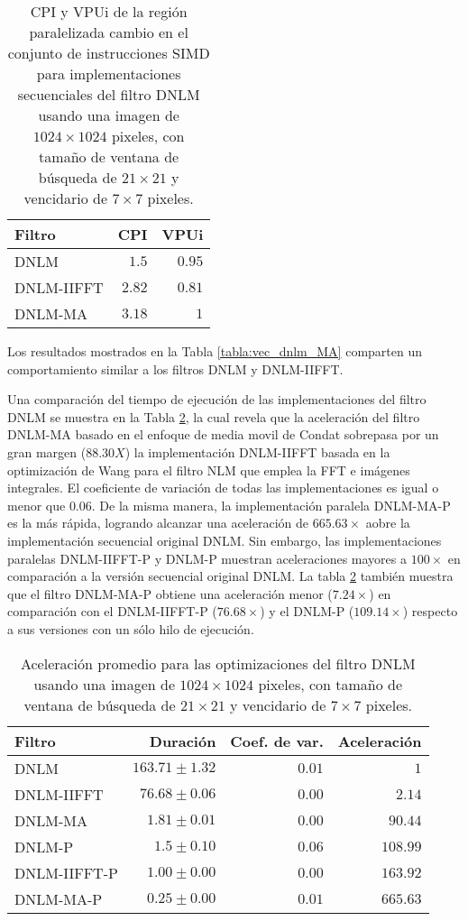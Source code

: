 \begin{table}
\protect\caption[Métricas CPI y VPUi de los filtros con 1 hilo]{CPI y VPUi de  la región paralelizada cambio en el conjunto de instrucciones SIMD para implementaciones secuenciales del filtro DNLM usando una imagen de  $1024 \times 1024$ pixeles, con tama\~no de ventana de búsqueda de $21 \times 21$ y vencidario de $7 \times 7$ pixeles. \label{tabla:vpui}}
\centering
\begin{tabular}{lrr}
Filtro  & CPI & VPUi \tabularnewline
\hline
DNLM & $1.5$ & $0.95$\tabularnewline
DNLM-IIFFT &$2.82$ & $0.81$  \tabularnewline
DNLM-MA &$3.18$&  $1$  \tabularnewline
\end{tabular}
\end{table}

Los resultados mostrados en la Tabla \ref{tabla:vec_dnlm_MA} comparten un comportamiento similar a los filtros DNLM y DNLM-IIFFT. 



Una comparación del tiempo de ejecución de las implementaciones del filtro DNLM se muestra en la Tabla \ref{tabla:speedup}, la cual revela que la aceleración del filtro DNLM-MA basado en el enfoque de media movil de Condat \cite{Condat2010} sobrepasa por un gran margen ($88.30X$) la implementación DNLM-IIFFT \cite{CalderonRamirez2017} basada en la optimización de Wang para el filtro NLM \cite{wang2006fast} que emplea la FFT e imágenes integrales. El coeficiente de variación de todas las implementaciones es igual o menor que $0.06$. 
De la misma manera, la implementación paralela DNLM-MA-P es la más rápida, logrando alcanzar una aceleración de $665.63\times$ aobre la implementación secuencial original DNLM. Sin embargo, las implementaciones paralelas DNLM-IIFFT-P y DNLM-P muestran aceleraciones mayores a $100\times$ en comparación a la versión secuencial original DNLM.
La tabla \ref{tabla:speedup} también muestra que el filtro DNLM-MA-P obtiene una aceleración menor ($7.24\times$) en comparación con el DNLM-IIFFT-P ($76.68\times$) y el DNLM-P ($109.14\times$) respecto a sus versiones con un sólo hilo de ejecución.



\begin{table}
\protect\caption[Aceleración promedio de optimizaciones del filtro DNLM]{Aceleración promedio para las optimizaciones del filtro DNLM usando una imagen de  $1024 \times 1024$ pixeles, con tama\~no de ventana de búsqueda de $21 \times 21$ y vencidario de $7 \times 7$ pixeles. \label{tabla:speedup}}
\centering
\begin{tabular}{lrrr}
Filtro & Duración \left[s\right]& Coef. de var. & Aceleración \left[x\right]\tabularnewline
\hline
DNLM & $163.71\pm1.32$ & $0.01$ & $1$\tabularnewline
DNLM-IIFFT & $76.68\pm0.06$ & $0.00$ & $2.14$\tabularnewline
DNLM-MA & $1.81\pm 0.01$ & $0.00$ & $90.44$ \tabularnewline
DNLM-P & $1.5\pm0.10$ & $0.06$ & $108.99$\tabularnewline
DNLM-IIFFT-P & $1.00\pm0.00$ & $0.00$ & $163.92$ \tabularnewline 
DNLM-MA-P & $\boldsymbol{0.25\pm0.00}$ & $\boldsymbol{0.01}$ &  $\boldsymbol{665.63}$\tabularnewline
\end{tabular}
\end{table}


